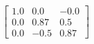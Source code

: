 \documentclass[preview]{standalone}
\begin{document}
\begin{align*}
\left[ \begin{array}{ccc}1.0 & 0.0 & -0.0 \\ 0.0 & 0.87 & 0.5 \\ 0.0 & -0.5 & 0.87\end{array} \right]
\end{align*}
\end{document}
